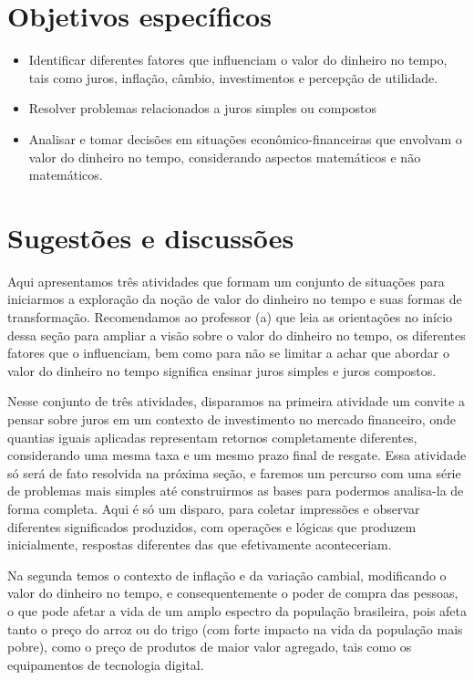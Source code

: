 \begin{texto}
{\def\currentcolor{session1}
\section{Objetivos específicos}
\begin{itemize}
\item Identificar diferentes fatores que influenciam o valor do dinheiro no tempo, tais como juros, inflação, câmbio, investimentos e percepção de utilidade.
\item Resolver problemas relacionados a juros simples ou compostos
\item Analisar e tomar decisões em situações econômico-financeiras que envolvam o valor do dinheiro no tempo, considerando aspectos matemáticos e não matemáticos.
\end{itemize}

\section{Sugestões e discussões}

Aqui apresentamos três atividades que formam um conjunto de situações para iniciarmos a exploração da noção de valor do dinheiro no tempo e suas formas de transformação.
Recomendamos ao professor (a) que leia as orientações no início dessa seção para ampliar a visão sobre o valor do dinheiro no tempo, os diferentes fatores que o influenciam, bem como para não se limitar a achar que abordar o valor do dinheiro no tempo significa ensinar juros simples e juros compostos. 

Nesse conjunto de três atividades, disparamos na primeira atividade um convite a pensar sobre juros em um contexto de investimento no mercado financeiro, onde quantias iguais aplicadas representam retornos completamente diferentes, considerando uma mesma taxa e um mesmo prazo final de resgate. Essa atividade só será de fato resolvida na próxima seção, e faremos um percurso com uma série de problemas mais simples até construirmos as bases para podermos analisa-la de forma completa. Aqui é só um disparo, para coletar impressões e observar diferentes significados produzidos, com operações e lógicas que produzem inicialmente, respostas diferentes das que efetivamente aconteceriam.

Na segunda temos o contexto de inflação e da variação cambial, modificando o valor do dinheiro no tempo, e consequentemente o poder de compra das pessoas, o que pode afetar a vida de um amplo espectro da população brasileira, pois afeta tanto o preço do arroz ou do trigo (com forte impacto na vida da população mais pobre), como o preço de produtos de maior valor agregado, tais como os equipamentos de tecnologia digital.

}
\end{texto}
